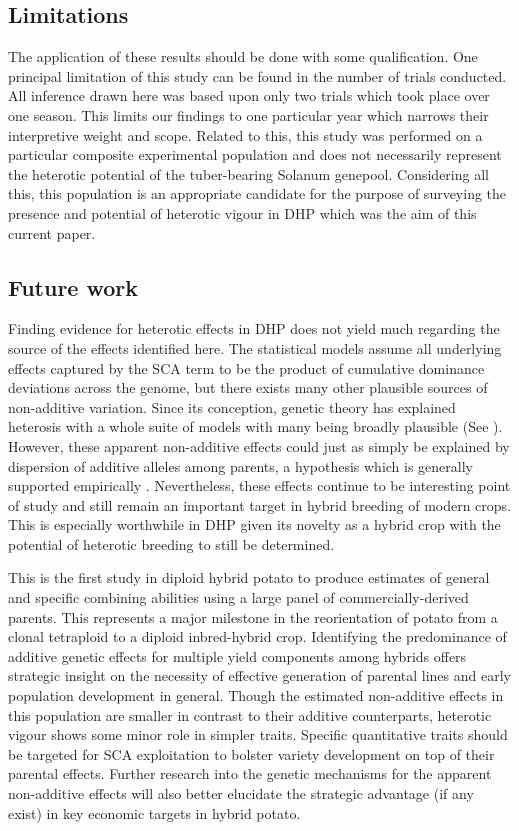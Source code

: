 \subsection{Limitations}\label{limitations}

The application of these results should be done with some qualification. One principal limitation of this study can be found in the number of trials conducted. All inference drawn here was based upon only two trials which took place over one season. This limits our findings to one particular year which narrows their interpretive weight and scope. Related to this, this study was performed on a particular composite experimental population and does not necessarily represent the heterotic potential of the tuber-bearing Solanum genepool. Considering all this, this population is an appropriate candidate for the purpose of surveying the presence and potential of heterotic vigour in DHP which was the aim of this current paper. 

\subsection{Future work}\label{future-work}

Finding evidence for heterotic effects in DHP does not yield much regarding the source of the effects identified here. The statistical models assume all underlying effects captured by the SCA term to be the product of cumulative dominance deviations across the genome, but there exists many other plausible sources of non-additive variation. Since its conception, genetic theory has explained heterosis with a whole suite of models with many being broadly plausible (See \citep{Labroo2021}). However, these apparent non-additive effects could just as simply be explained by dispersion of additive alleles among parents, a hypothesis which is generally supported empirically \citep{Pearson1983, Mackay2021}. Nevertheless, these effects continue to be interesting point of study and still remain an important target in hybrid breeding of modern crops. This is especially worthwhile in DHP given its novelty as a hybrid crop with the potential of heterotic breeding to still be determined.


This is the first study in diploid hybrid potato to produce estimates of general and specific combining abilities using a large panel of commercially-derived parents. This represents a major milestone in the reorientation of potato from a clonal tetraploid to a diploid inbred-hybrid crop. Identifying the predominance of additive genetic effects for multiple yield components among hybrids offers strategic insight on the necessity of effective generation of parental lines and early population development in general. Though the estimated non-additive effects in this population are smaller in contrast to their additive counterparts, heterotic vigour shows some minor role in simpler traits. Specific quantitative traits should be targeted for SCA exploitation to bolster variety development on top of their parental effects. Further research into the genetic mechanisms for the apparent non-additive effects will also better elucidate the strategic advantage (if any exist) in key economic targets in hybrid potato.


